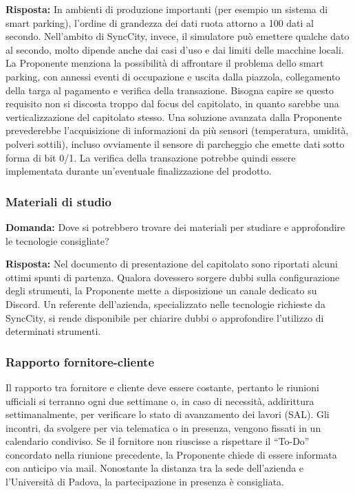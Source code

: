 \textbf{Risposta:} In ambienti di produzione importanti (per esempio un sistema di smart parking), l’ordine di grandezza dei dati ruota attorno a 100 dati al secondo. Nell'ambito di SyncCity, invece, il simulatore può emettere qualche dato al secondo, molto dipende anche dai casi d'uso e dai limiti delle macchine locali. La Proponente menziona la possibilità di affrontare il problema dello smart parking, con annessi eventi di occupazione e uscita dalla piazzola, collegamento della targa al pagamento e verifica della transazione.
Bisogna capire se questo requisito non si discosta troppo dal focus del capitolato, in quanto sarebbe una verticalizzazione del capitolato stesso. Una soluzione avanzata dalla Proponente prevederebbe l’acquisizione di informazioni da più sensori (temperatura, umidità, polveri sottili), incluso ovviamente il sensore di parcheggio che emette dati sotto forma di bit 0/1. La verifica della transazione potrebbe quindi essere implementata durante un’eventuale finalizzazione del prodotto.

\subsubsection{Materiali di studio}
\textbf{Domanda:} Dove si potrebbero trovare dei materiali per studiare e approfondire le tecnologie consigliate?

\textbf{Risposta:} Nel documento di presentazione del capitolato sono riportati alcuni ottimi spunti di partenza. Qualora dovessero sorgere dubbi sulla configurazione degli strumenti, la Proponente mette a disposizione un canale dedicato su Discord. Un referente dell’azienda, specializzato nelle tecnologie richieste da SyncCity, si rende disponibile per chiarire dubbi o approfondire l’utilizzo di determinati strumenti.

\subsubsection{Rapporto fornitore-cliente}\label{rapporto fornitore-cliente}
Il rapporto tra fornitore e cliente deve essere costante, pertanto le riunioni ufficiali si terranno ogni due settimane o, in caso di necessità, addirittura settimanalmente, per verificare lo stato di avanzamento dei lavori (SAL). Gli incontri, da svolgere per via telematica o in presenza, vengono fissati in un calendario condiviso. Se il fornitore non riuscisse a rispettare il “To-Do” concordato nella riunione precedente, la Proponente chiede di essere informata con anticipo via mail. Nonostante la distanza tra la sede dell’azienda e l’Università di Padova, la partecipazione in presenza è consigliata.

